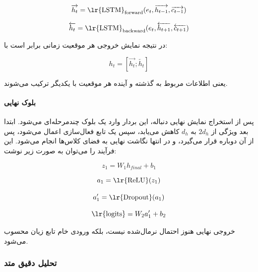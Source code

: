 \documentclass{article}
\begin{document}
\begin{equation}
	\overrightarrow{h_t} = \text{\lr{LSTM}}_{\text{forward}}(e_t,\overrightarrow{h_{t-1}},\overrightarrow{c_{t-1}})
\end{equation}

\begin{equation}
	\overleftarrow{h_t} = \text{\lr{LSTM}}_{\text{backward}}(e_t,\overleftarrow{h_{t+1}},\overleftarrow{c_{t+1}})
\end{equation}

در نتیجه نمایش خروجی هر موقعیت زمانی برابر است با:

\begin{equation}
	h_t = [\overrightarrow{h_t};\overleftarrow{h_t}]
\end{equation}

یعنی اطلاعات مربوط به گذشته و آینده هر موقعیت با یکدیگر ترکیب می‌شوند.

\paragraph{بلوک نهایی }
پس از استخراج نمایش نهایی دنباله، این بردار وارد یک بلوک  چندمرحله‌ای می‌شود. ابتدا بعد ویژگی از \(2d_h\) به \(d_h\) کاهش می‌یابد، سپس یک تابع فعال‌سازی  اعمال می‌شود، پس از آن دوباره  قرار می‌گیرد، و در انتها نگاشت نهایی به فضای کلاس‌ها انجام می‌شود. این فرآیند را می‌توان به صورت زیر نوشت:

\begin{equation}
	z_1 = W_1 h_{final} + b_1
\end{equation}

\begin{equation}
	a_1 = \text{\lr{ReLU}}(z_1)
\end{equation}

\begin{equation}
	a_1' = \text{\lr{Dropout}}(a_1)
\end{equation}

\begin{equation}
	\text{\lr{logits}} = W_2 a_1' + b_2
\end{equation}

خروجی نهایی  هنوز احتمال نرمال‌شده نیست، بلکه ورودی خام تابع زیان  محسوب می‌شود.

\subsubsection{تحلیل دقیق متد }
\end{document}
